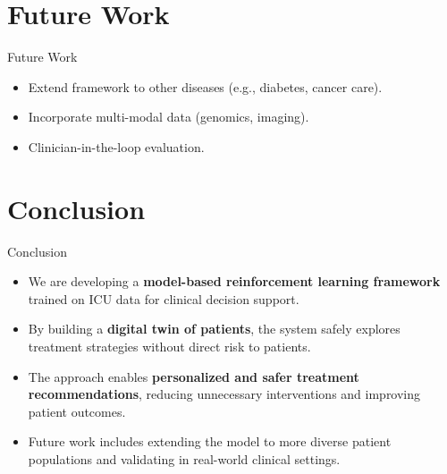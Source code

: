 \documentclass[11pt]{beamer}
\begin{document}
\section{Future Work}
\begin{frame}{Future Work}
\begin{itemize}
    \item Extend framework to other diseases (e.g., diabetes, cancer care).  
    \item Incorporate multi-modal data (genomics, imaging).  
    \item Clinician-in-the-loop evaluation.  
\end{itemize}
\end{frame}


\section{Conclusion}
\begin{frame}{Conclusion}
\begin{itemize}
    \item We are developing a \textbf{model-based reinforcement learning framework} trained on ICU data for clinical decision support.  
    \vspace{6pt}
    \item By building a \textbf{digital twin of patients}, the system safely explores treatment strategies without direct risk to patients.  
    \vspace{6pt}
    \item The approach enables \textbf{personalized and safer treatment recommendations}, reducing unnecessary interventions and improving patient outcomes.  
    \vspace{6pt}
    \item Future work includes extending the model to more diverse patient populations and validating in real-world clinical settings.  
\end{itemize}
\end{frame}



\end{document}
